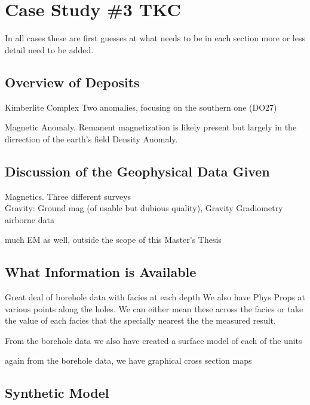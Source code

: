 
\chapter{Case Study \#3 TKC}
\label{ch:CaseStudy1}

In all cases these are first guesses at what needs to be in each section more or less detail need to be added.



\section{Overview of Deposits}
\label{sec:Overview of Deposits:TKC}

Kimberlite Complex
Two anomalies, focusing on the southern one (DO27)

Magnetic Anomaly. Remanent magnetization is likely present but largely in the dirrection of the earth's field
Density Anomaly. 
\section{Discussion of the Geophysical Data Given}
\label{sec:Discussion of the Geophysical Data Given:TKC}

Magnetics. Three different surveys\\
Gravity: Ground mag (of usable but dubious quality), Gravity Gradiometry airborne data

much EM as well, outside the scope of this Master's Thesis

\section{What Information is Available}
\label{sec:What Information is Available:TKC}

Great deal of borehole data with facies at each depth
We also have Phys Props at various points along the holes. We can either mean these across the facies or take the value of each facies that the specially nearest the the measured result.

From the borehole data we also have created a surface model of each of the units

again from the borehole data, we have graphical cross section maps

\section{Synthetic Model}
\label{sec:Synthetic Model:TKC}

